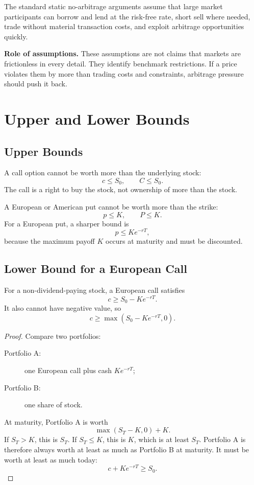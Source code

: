 The standard static no-arbitrage arguments assume that large market
participants can borrow and lend at the risk-free rate, short sell where needed,
trade without material transaction costs, and exploit arbitrage opportunities
quickly.

\begin{boxF}
\textbf{Role of assumptions.} These assumptions are not claims that markets are
frictionless in every detail. They identify benchmark restrictions. If a price
violates them by more than trading costs and constraints, arbitrage pressure
should push it back.
\end{boxF}

\section{Upper and Lower Bounds}

\subsection{Upper Bounds}

A call option cannot be worth more than the underlying stock:
\[
    c \leq S_0,
    \qquad
    C \leq S_0.
\]
The call is a right to buy the stock, not ownership of more than the stock.

A European or American put cannot be worth more than the strike:
\[
    p \leq K,
    \qquad
    P \leq K.
\]
For a European put, a sharper bound is
\[
    p \leq K e^{-rT},
\]
because the maximum payoff $K$ occurs at maturity and must be discounted.

\subsection{Lower Bound for a European Call}

For a non-dividend-paying stock, a European call satisfies
\[
    c \geq S_0 - K e^{-rT}.
\]
It also cannot have negative value, so
\[
    c \geq \max(S_0 - K e^{-rT},0).
\]

\begin{proof}
Compare two portfolios:
\begin{description}
    \item[Portfolio A:] one European call plus cash $K e^{-rT}$;
    \item[Portfolio B:] one share of stock.
\end{description}
At maturity, Portfolio A is worth
\[
    \max(S_T-K,0)+K.
\]
If $S_T>K$, this is $S_T$. If $S_T\leq K$, this is $K$, which is at least
$S_T$. Portfolio A is therefore always worth at least as much as Portfolio B at
maturity. It must be worth at least as much today:
\[
    c + K e^{-rT} \geq S_0.
\]
\end{proof}


